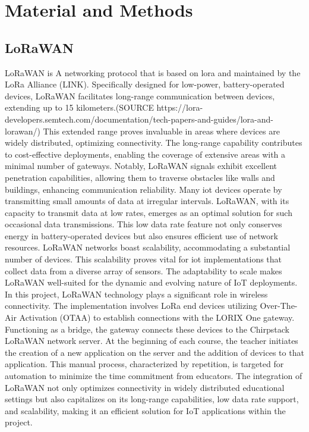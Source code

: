 
\chapter{Material and Methods} \label{ch:mat_met}
\section{LoRaWAN}
LoRaWAN is A networking protocol that is based on \gls{lora} and maintained by the LoRa Alliance (LINK).
Specifically designed for low-power, battery-operated devices, LoRaWAN facilitates long-range communication between devices, extending up to 15 kilometers.(SOURCE https://lora-developers.semtech.com/documentation/tech-papers-and-guides/lora-and-lorawan/)
This extended range proves invaluable in areas where devices are widely distributed, optimizing connectivity.
The long-range capability contributes to cost-effective deployments, enabling the coverage of extensive areas with a minimal number of gateways.
Notably, LoRaWAN signals exhibit excellent penetration capabilities, allowing them to traverse obstacles like walls and buildings, enhancing communication reliability.
Many \gls{iot} devices operate by transmitting small amounts of data at irregular intervals.
LoRaWAN, with its capacity to transmit data at low rates, emerges as an optimal solution for such occasional data transmissions.
This low data rate feature not only conserves energy in battery-operated devices but also ensures efficient use of network resources.
LoRaWAN networks boast scalability, accommodating a substantial number of devices.
This scalability proves vital for \gls{iot} implementations that collect data from a diverse array of sensors.
The adaptability to scale makes LoRaWAN well-suited for the dynamic and evolving nature of IoT deployments.
In this project, LoRaWAN technology plays a significant role in wireless connectivity.
The implementation involves LoRa end devices utilizing Over-The-Air Activation (OTAA) to establish connections with the LORIX One gateway.
Functioning as a bridge, the gateway connects these devices to the Chirpstack LoRaWAN network server.
At the beginning of each course, the teacher initiates the creation of a new application on the server and the addition of devices to that application.
This manual process, characterized by repetition, is targeted for automation to minimize the time commitment from educators.
The integration of LoRaWAN not only optimizes connectivity in widely distributed educational settings but also capitalizes on its long-range capabilities, low data rate support, and scalability, making it an efficient solution for IoT applications within the project.

